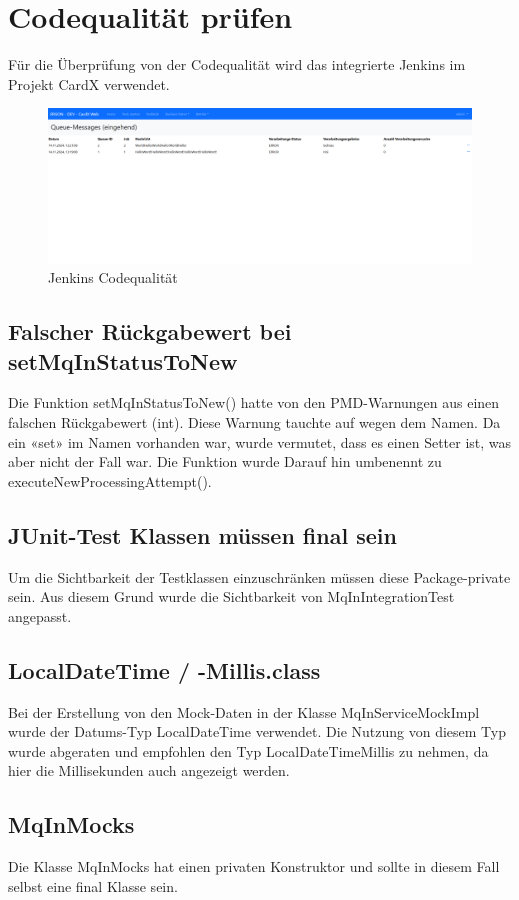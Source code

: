 \section{Codequalität prüfen}
Für die Überprüfung von der Codequalität wird das integrierte Jenkins im Projekt CardX verwendet.

\begin{figure}[H]
	\begin{center}
		\includegraphics[width=1\textwidth]{ressourcen/4.2_Tabelle}
		\caption[Jenkins Codequalität]{Jenkins Codequalität}\label{ch:code-quality}
	\end{center}
\end{figure}

\subsection{Falscher Rückgabewert bei setMqInStatusToNew}
Die Funktion setMqInStatusToNew() hatte von den PMD-Warnungen aus einen falschen Rückgabewert (int). Diese Warnung tauchte auf wegen dem Namen. Da ein «set» im Namen vorhanden war, wurde vermutet, dass es einen Setter ist, was aber nicht der Fall war. Die Funktion wurde Darauf hin umbenennt zu executeNewProcessingAttempt().

\subsection{JUnit-Test Klassen müssen final sein}
Um die Sichtbarkeit der Testklassen einzuschränken müssen diese Package-private sein. Aus diesem Grund wurde die Sichtbarkeit von MqInIntegrationTest angepasst.

\subsection{LocalDateTime / -Millis.class}
Bei der Erstellung von den Mock-Daten in der Klasse MqInServiceMockImpl wurde der Datums-Typ LocalDateTime verwendet. Die Nutzung von diesem Typ wurde abgeraten und empfohlen den Typ LocalDateTimeMillis zu nehmen, da hier die Millisekunden auch angezeigt werden.

\subsection{MqInMocks}
Die Klasse MqInMocks hat einen privaten Konstruktor und sollte in diesem Fall selbst eine final Klasse sein.


\newpage